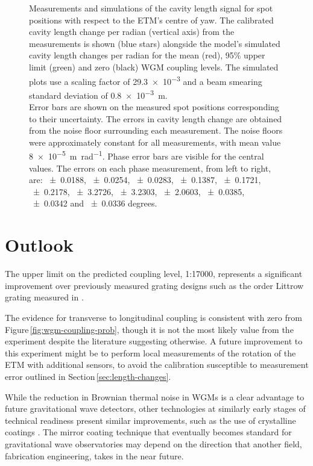 \begin{figure}
  \centering
  
  \caption[Measurements and simulations of the cavity length signal for spot positions with respect to the end test mass's centre of yaw]{\label{fig:wgm-coupling}Measurements and simulations of the cavity length signal for spot positions with respect to the \gls{ETM}'s centre of yaw. The calibrated cavity length change per radian (vertical axis) from the measurements is shown (blue stars) alongside the model's simulated cavity length changes per radian for the mean (red), 95\% upper limit (green) and zero (black) \gls{WGM} coupling levels. The simulated plots use a scaling factor of \num{29.3e-3} and a beam smearing standard deviation of \SI{0.8e-3}{\meter}.
  \bigskip
  \\ Error bars are shown on the measured spot positions corresponding to their uncertainty. The errors in cavity length change are obtained from the noise floor surrounding each measurement. The noise floors were approximately constant for all measurements, with mean value \SI{8e-5}{\meter \per \radian}. Phase error bars are visible for the central values. The errors on each phase measurement, from left to right, are: \num{+-0.0188}, \num{+-0.0254}, \num{+-0.0283}, \num{+-0.1387}, \num{+-0.1721}, \num{+-0.2178}, \num{+-3.2726}, \num{+-3.2303}, \num{+-2.0603}, \num{+-0.0385}, \num{+-0.0342} and \num{+-0.0336} degrees.}
\end{figure}

\section{Outlook}
The upper limit on the predicted coupling level, 1:17000, represents a significant improvement over previously measured grating designs such as the  order Littrow grating measured in \cite{Barr2011}.

The evidence for transverse to longitudinal coupling is consistent with zero from Figure\,\ref{fig:wgm-coupling-prob}, though it is not the most likely value from the experiment despite the literature suggesting otherwise. A future improvement to this experiment might be to perform local measurements of the rotation of the \gls{ETM} with additional sensors, to avoid the calibration susceptible to measurement error outlined in Section\,\ref{sec:length-changes}.

While the reduction in Brownian thermal noise in \glspl{WGM} is a clear advantage to future gravitational wave detectors, other technologies at similarly early stages of technical readiness present similar improvements, such as the use of crystalline coatings \cite{Cole2013}. The mirror coating technique that eventually becomes standard for gravitational wave observatories may depend on the direction that another field, fabrication engineering, takes in the near future.